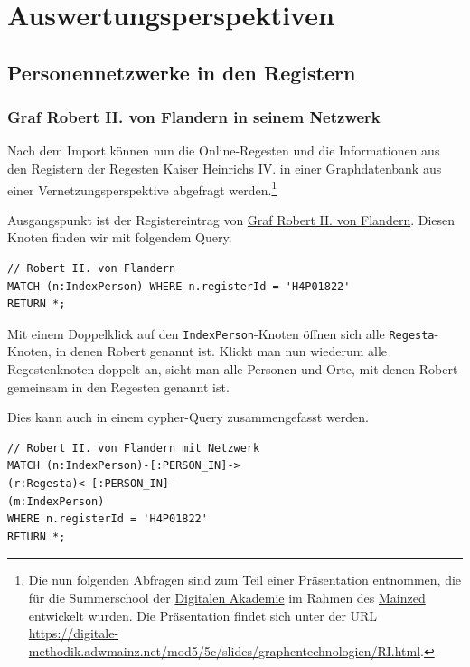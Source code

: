 \documentclass[ngerman,]{scrreprt}
\begin{document}
\section{Auswertungsperspektiven}\label{auswertungsperspektiven}

\subsection{Personennetzwerke in den Registern}\label{personennetzwerke-in-den-registern}

\subsubsection{Graf Robert II. von Flandern in seinem Netzwerk}\label{graf-robert-ii.-von-flandern-in-seinem-netzwerk}

Nach dem Import können nun die Online-Regesten und die Informationen aus den Registern der Regesten Kaiser Heinrichs IV. in einer Graphdatenbank aus einer Vernetzungsperspektive abgefragt werden.\footnote{Die nun folgenden Abfragen sind zum Teil einer Präsentation entnommen, die für die Summerschool der \href{https://www.digitale-akademie.de}{Digitalen Akademie} im Rahmen des \href{https://www.mainzed.org/de}{Mainzed} entwickelt wurden. Die Präsentation findet sich unter der URL \url{https://digitale-methodik.adwmainz.net/mod5/5c/slides/graphentechnologien/RI.html}.}

Ausgangspunkt ist der Registereintrag von \href{https://de.wikipedia.org/wiki/Robert_II._(Flandern)}{Graf Robert II. von Flandern}. Diesen Knoten finden wir mit folgendem Query.

\begin{verbatim}
// Robert II. von Flandern
MATCH (n:IndexPerson) WHERE n.registerId = 'H4P01822'
RETURN *;
\end{verbatim}

Mit einem Doppelklick auf den \texttt{IndexPerson}-Knoten öffnen sich alle \texttt{Regesta}-Knoten, in denen Robert genannt ist. Klickt man nun wiederum alle Regestenknoten doppelt an, sieht man alle Personen und Orte, mit denen Robert gemeinsam in den Regesten genannt ist.

Dies kann auch in einem cypher-Query zusammengefasst werden.

\begin{verbatim}
// Robert II. von Flandern mit Netzwerk
MATCH (n:IndexPerson)-[:PERSON_IN]->
(r:Regesta)<-[:PERSON_IN]-
(m:IndexPerson)
WHERE n.registerId = 'H4P01822'
RETURN *;
\end{verbatim}
\end{document}
